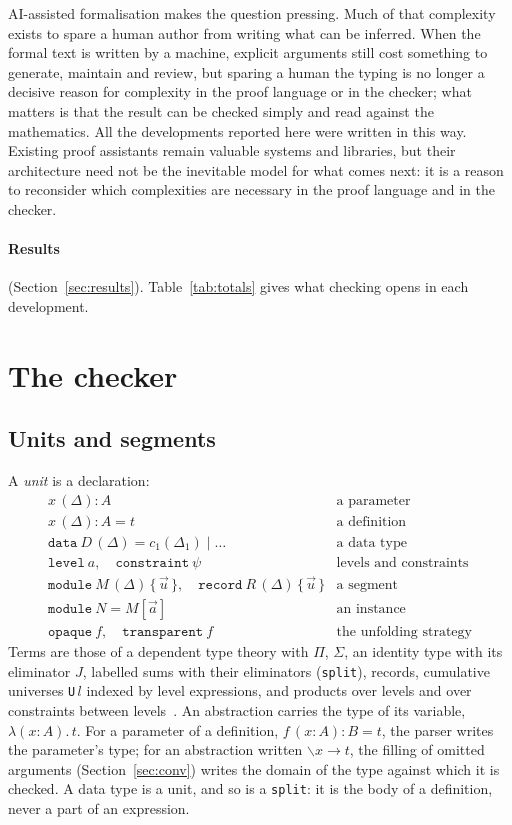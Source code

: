 \documentclass[11pt]{article}
\newcommand{\kw}[1]{\texttt{#1}}
\begin{document}
AI-assisted formalisation makes the question pressing. Much of that
complexity exists to spare a human author from writing what can be
inferred. When the formal text is written by a machine, explicit
arguments still cost something to generate, maintain and review, but
sparing a human the typing is no longer a decisive reason for
complexity in the proof language or in the checker; what matters is
that the result can be checked simply and read against the
mathematics. All the developments
reported here were written in this way. Existing proof assistants remain
valuable systems and libraries, but their architecture need not be the
inevitable model for what comes next: it is a reason to reconsider which
complexities are necessary in the proof language and in the checker.

\paragraph{Results} (Section~\ref{sec:results}).
Table~\ref{tab:totals} gives what checking opens in each development.

\section{The checker}\label{sec:checker}

\subsection{Units and segments}

A \emph{unit} is a declaration:
\[
\begin{array}{ll}
x\,(\Delta) : A & \text{a parameter}\\
x\,(\Delta) : A = t & \text{a definition}\\
\kw{data}\ D\,(\Delta) = c_1(\Delta_1)\mid\dots & \text{a data type}\\
\kw{level}\ a,\quad \kw{constraint}\ \psi & \text{levels and constraints}\\
\kw{module}\ M\,(\Delta)\,\{\,\vec u\,\},\quad \kw{record}\ R\,(\Delta)\,\{\,\vec u\,\}
  & \text{a segment}\\
\kw{module}\ N = M[\vec a] & \text{an instance}\\
\kw{opaque}\ f,\quad \kw{transparent}\ f & \text{the unfolding strategy}
\end{array}
\]
Terms are those of a dependent type theory with $\Pi$, $\Sigma$, an
identity type with its eliminator $J$, labelled sums with their
eliminators (\kw{split}), records, cumulative universes \kw{U}\,$l$
indexed by level expressions, and products over levels and over
constraints between levels~\cite{BCDE}. An abstraction carries the type
of its variable, $\lambda(x:A).\,t$. For a parameter of a definition,
$f\,(x:A) : B = t$, the parser writes the parameter's type; for an
abstraction written $\backslash x \to t$, the filling of omitted arguments
(Section~\ref{sec:conv}) writes the domain of the type against which it
is checked. A data type is a unit, and so is a \kw{split}: it is the body
of a definition, never a part of an expression.
\end{document}
